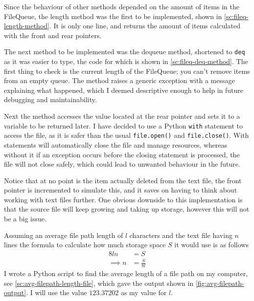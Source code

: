         Since the behaviour of other methods depended on the amount of items in the FileQueue, the length method was the first to be implemented, shown in \autoref{sc:fileq-length-method}. 
        It is only one line, and returns the amount of items calculated with the front and rear pointers. 



        The next method to be implemented was the dequeue method, shortened to \verb|deq| as it was easier to type, the code for which is shown in \autoref{sc:fileq-deq-method}. 
        The first thing to check is the current length of the FileQueue; you can't remove items from an empty queue. 
        The method raises a generic exception with a message explaining what happened, which I deemed descriptive enough to help in future debugging and maintainability.

        Next the method accesses the value located at the rear pointer and sets it to a variable to be returned later. 
        I have decided to use a Python \verb|with| statement to access the file, as it is safer than the usual \verb|file.open()| and \verb|file.close()|. 
        With statements will automatically close the file and manage resources, whereas without it if an exception occurs before the closing statement is processed, the file will not close safely, which could lead to unwanted behaviour in the future. 

        Notice that at no point is the item actually deleted from the text file, the front pointer is incremented to simulate this, and it saves on having to think about working with text files further. 
        One obvious downside to this implementation is that the source file will keep growing and taking up storage, however this will not be a big issue. 

        Assuming an average file path length of $l$ characters and the text file having $n$ lines the formula to calculate how much storage space $S$ it would use is as follows
        \begin{align*}
            8ln &= S \\
            \implies n &= \frac{S}{8l}
        \end{align*}
        I wrote a Python script to find the average length of a file path on my computer, see \autoref{sc:avg-filepath-length-file}, which gave the output shown in \autoref{fig:avg-filepath-output}. 
        I will use the value $123.37202$ as my value for $l$. 

